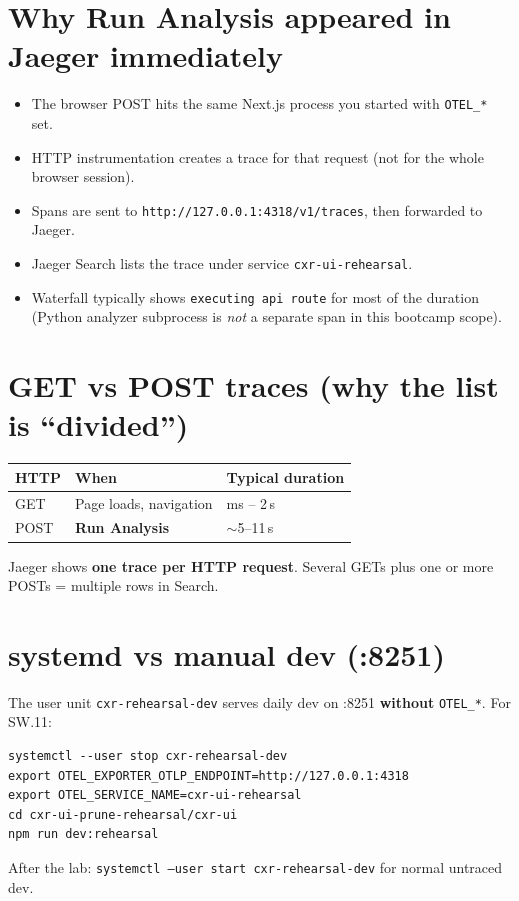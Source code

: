 \documentclass[11pt,a4paper]{report}
\begin{document}
\section{Why Run Analysis appeared in Jaeger immediately}

\begin{itemize}
  \item The browser POST hits the same Next.js process you started with \texttt{OTEL\_*} set.
  \item HTTP instrumentation creates a trace for that request (not for the whole browser session).
  \item Spans are sent to \texttt{http://127.0.0.1:4318/v1/traces}, then forwarded to Jaeger.
  \item Jaeger Search lists the trace under service \texttt{cxr-ui-rehearsal}.
  \item Waterfall typically shows \texttt{executing api route} for most of the duration (Python analyzer subprocess is \emph{not} a separate span in this bootcamp scope).
\end{itemize}

\section{GET vs POST traces (why the list is ``divided'')}

\begin{center}
\begin{tabular}{lll}
\toprule
HTTP & When & Typical duration \\
\midrule
GET & Page loads, navigation & ms -- 2\,s \\
POST & \textbf{Run Analysis} & $\sim$5--11\,s \\
\bottomrule
\end{tabular}
\end{center}
Jaeger shows \textbf{one trace per HTTP request}. Several GETs plus one or more POSTs = multiple rows in Search.

\section{systemd vs manual dev (:8251)}

The user unit \texttt{cxr-rehearsal-dev} serves daily dev on :8251 \textbf{without} \texttt{OTEL\_*}.
For SW.11:
\begin{lstlisting}[style=bash]
systemctl --user stop cxr-rehearsal-dev
export OTEL_EXPORTER_OTLP_ENDPOINT=http://127.0.0.1:4318
export OTEL_SERVICE_NAME=cxr-ui-rehearsal
cd cxr-ui-prune-rehearsal/cxr-ui
npm run dev:rehearsal
\end{lstlisting}
After the lab: \texttt{systemctl --user start cxr-rehearsal-dev} for normal untraced dev.
\end{document}
